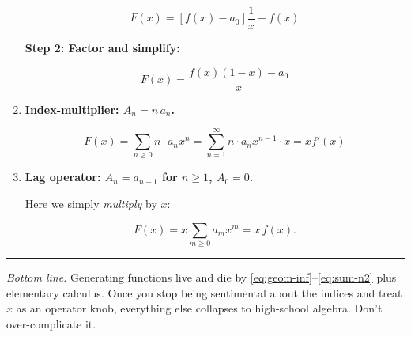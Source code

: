 \documentclass[docmute]{article}
\begin{document}
\begin{enumerate}[label=\textbf{2(\alph*)}\quad]
\[
F(x) = \left[ f(x) - a_0 \right] \frac{1}{x} - f(x)
\]

\textbf{Step 2: Factor and simplify:}

\[
F(x) = \frac{f(x)(1 - x) - a_0}{x}
\]

\medskip\item \textbf{Index-multiplier: $A_{n}=n\,a_{n}$.}

\[
F(x) = \sum_{n \geq 0} n \cdot a_n x^n = \sum_{n=1}^{\infty} n \cdot a_n x^{n-1} \cdot x = x f'(x)
\]


\medskip\item \textbf{Lag operator: $A_{n}=a_{n-1}$ for $n\ge1$, $A_{0}=0$.}

Here we simply \emph{multiply} by $x$:

\[
   F(x)=x\sum_{m\ge0}a_{m}x^{m}=x\,f(x).
\]


\end{enumerate}

\bigskip
\hrule
\bigskip

\noindent
\emph{Bottom line.}  Generating functions live and die by
\eqref{eq:geom-inf}–\eqref{eq:sum-n2} plus elementary calculus.  Once you stop
being sentimental about the indices and treat $x$ as an operator knob,
everything else collapses to high-school algebra.  Don’t over-complicate it.
\end{document}
